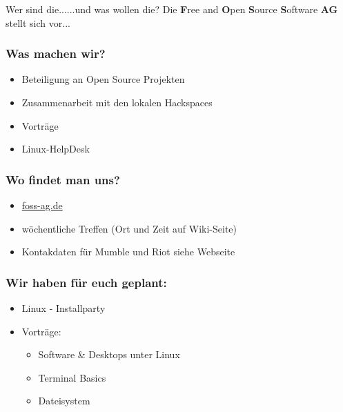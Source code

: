 \begin{frame}{Wer sind die...}{...und was wollen die?}
	Die \textbf{F}ree and \textbf{O}pen \textbf{S}ource \textbf{S}oftware \textbf{AG} stellt sich vor... 
\end{frame}

\begin{frame}
\frametitle{Was machen wir?}
\begin{itemize}
	\item Beteiligung an Open Source Projekten
	\item Zusammenarbeit mit den lokalen Hackspaces
	\item Vorträge
	\item Linux-HelpDesk
\end{itemize}
\end{frame}

\begin{frame}
\frametitle{Wo findet man uns?}
\begin{itemize}
	\item \href{https://foss-ag.de}{foss-ag.de}
	\item wöchentliche Treffen (Ort und Zeit auf Wiki-Seite)
	\item Kontakdaten für Mumble und Riot siehe Webseite
\end{itemize}
\end{frame}

\begin{frame}
\frametitle{Wir haben für euch geplant:}
\begin{itemize}
	\item Linux - Installparty
	\item Vorträge:
	\begin{itemize}
		\item Software \& Desktops unter Linux
		\item Terminal Basics
		\item Dateisystem
	\end{itemize}
\end{itemize}
\end{frame}

